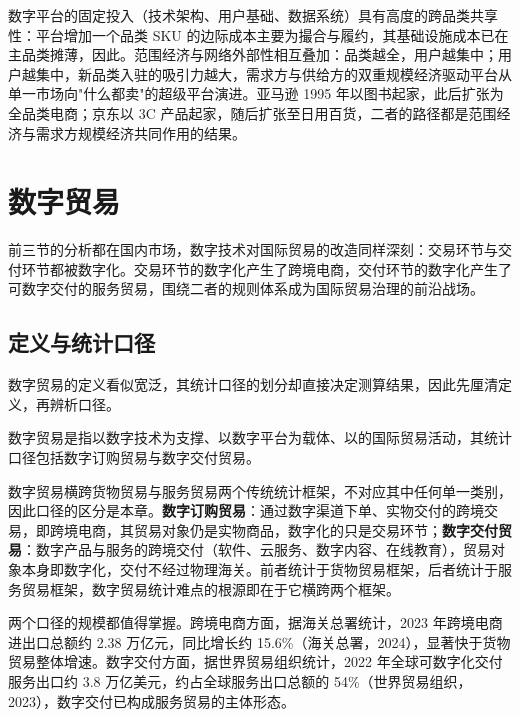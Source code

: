 数字平台的固定投入（技术架构、用户基础、数据系统）具有高度的跨品类共享性：平台增加一个品类 SKU 的边际成本主要为撮合与履约，其基础设施成本已在主品类摊薄，因此。范围经济与网络外部性相互叠加：品类越全，用户越集中；用户越集中，新品类入驻的吸引力越大，需求方与供给方的双重规模经济驱动平台从单一市场向"什么都卖"的超级平台演进。亚马逊 1995 年以图书起家，此后扩张为全品类电商；京东以 3C 产品起家，随后扩张至日用百货，二者的路径都是范围经济与需求方规模经济共同作用的结果。

\section{数字贸易}

前三节的分析都在国内市场，数字技术对国际贸易的改造同样深刻：交易环节与交付环节都被数字化。交易环节的数字化产生了跨境电商，交付环节的数字化产生了可数字交付的服务贸易，围绕二者的规则体系成为国际贸易治理的前沿战场。

\subsection{定义与统计口径}

数字贸易的定义看似宽泛，其统计口径的划分却直接决定测算结果，因此先厘清定义，再辨析口径。

\begin{definition}[数字贸易]
数字贸易是指以数字技术为支撑、以数字平台为载体、以的国际贸易活动，其统计口径包括数字订购贸易与数字交付贸易。
\end{definition}

数字贸易横跨货物贸易与服务贸易两个传统统计框架，不对应其中任何单一类别，因此口径的区分是本章。\textbf{数字订购贸易}：通过数字渠道下单、实物交付的跨境交易，即跨境电商，其贸易对象仍是实物商品，数字化的只是交易环节；\textbf{数字交付贸易}：数字产品与服务的跨境交付（软件、云服务、数字内容、在线教育），贸易对象本身即数字化，交付不经过物理海关。前者统计于货物贸易框架，后者统计于服务贸易框架，数字贸易统计难点的根源即在于它横跨两个框架。

两个口径的规模都值得掌握。跨境电商方面，据海关总署统计，2023 年跨境电商进出口总额约 2.38 万亿元，同比增长约 15.6\%（海关总署，2024），显著快于货物贸易整体增速。数字交付方面，据世界贸易组织统计，2022 年全球可数字化交付服务出口约 3.8 万亿美元，约占全球服务出口总额的 54\%（世界贸易组织，2023），数字交付已构成服务贸易的主体形态。

